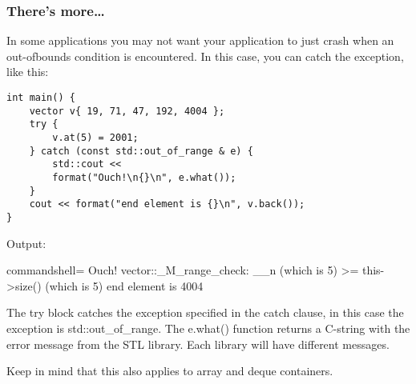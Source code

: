 \subsubsection{There's more…}

In some applications you may not want your application to just crash when an out-ofbounds condition is encountered. In this case, you can catch the exception, like this:

\begin{lstlisting}[style=styleCXX]
int main() {
	vector v{ 19, 71, 47, 192, 4004 };
	try {
		v.at(5) = 2001;
	} catch (const std::out_of_range & e) {
		std::cout <<
		format("Ouch!\n{}\n", e.what());
	}
	cout << format("end element is {}\n", v.back());
}
\end{lstlisting}

Output:

\begin{tcblisting}{commandshell={}}
Ouch!
vector::_M_range_check: __n (which is 5) >= this->size() (which is 5)
end element is 4004
\end{tcblisting}

The try block catches the exception specified in the catch clause, in this case the exception is std::out\_of\_range. The e.what() function returns a C-string with the error message from the STL library. Each library will have different messages.

Keep in mind that this also applies to array and deque containers.











